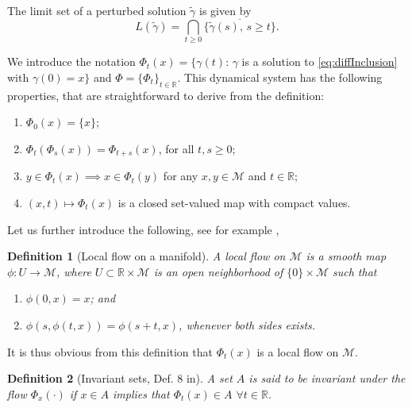 \documentclass{article}
\newtheorem{definition}{Definition}
\newcommand{\CM}{\mathcal{M}}
\newcommand{\BR}{\mathbb{R}}
\begin{document}
The limit set of a perturbed solution $\tilde\gamma$ is given by
\begin{equation}
    L(\tilde\gamma) = \bigcap_{t\geq 0}\overline{\{\tilde\gamma(s),\, s\geq t \}}.
\end{equation}

We introduce the notation $\Phi_t(x)=\{ \gamma(t):\,\gamma$ is a solution to \eqref{eq:diffInclusion} with $\gamma(0)=x\}$ and $\Phi=\{\Phi_t\}_{t\in\BR}$. This dynamical system has the following properties, that are straightforward to derive from the definition:
\begin{enumerate}
    \item $\Phi_0(x)=\{x\}$;
    \item $\Phi_t(\Phi_s(x))=\Phi_{t+s}(x)$, for all $t,s\geq0$;
    \item $y\in\Phi_t(x)\implies x\in\Phi_{t}(y)$ for any $x,y\in\CM$ and $t\in\BR$;
    \item $(x,t)\mapsto\Phi_t(x)$ is a closed set-valued map with compact values. 
\end{enumerate}

Let us further introduce the following, see for example \cite{boothby2003introduction},
\begin{definition}[Local flow on a manifold]
    A local flow on $\CM$ is a smooth map $\phi: U\to\CM$, where $U\subset \BR\times\CM$ is an open neighborhood of $\{0\}\times \CM$ such that
    \begin{enumerate}
        \item $\phi(0,x)=x$; and
        \item $\phi(s,\phi(t,x))=\phi(s+t,x)$, whenever both sides exists.
    \end{enumerate}
\end{definition}
It is thus obvious from this definition that $\Phi_t(x)$ is a local flow on $\CM$.


\begin{definition}[Invariant sets, Def. 8 in\cite{shah2021stochastic}]
     A set $A$ is said to be invariant under the flow $\Phi_x(\cdot)$ if $x\in A$ implies that $\Phi_t(x)\in A$ $\forall t\in\BR$. 
\end{definition}
\end{document}
